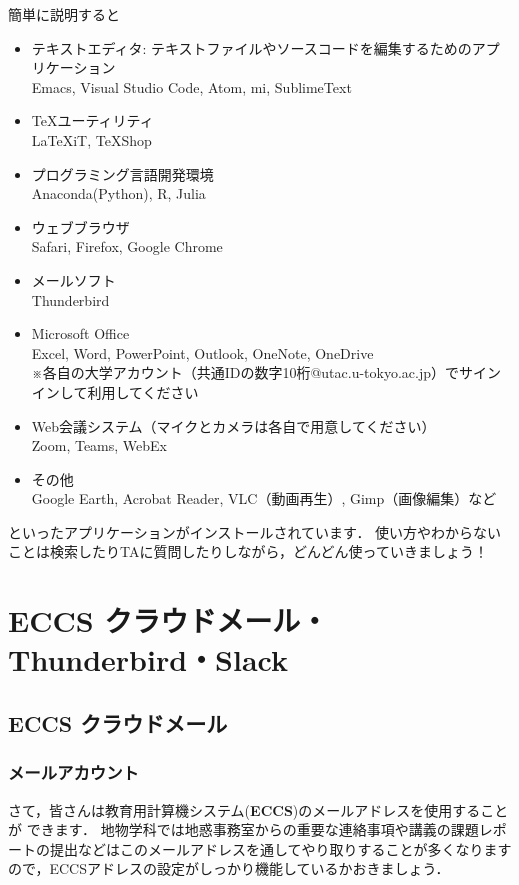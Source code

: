 \documentclass{jarticle}
\begin{document}
簡単に説明すると
\begin{itemize}
  \item テキストエディタ: テキストファイルやソースコードを編集するためのアプリケーション\\
    Emacs, Visual Studio Code, Atom, mi, SublimeText
  \item \TeX ユーティリティ\\
    LaTeXiT, TeXShop
  \item プログラミング言語開発環境\\
    Anaconda(Python), R, Julia
  \item ウェブブラウザ\\
    Safari, Firefox, Google Chrome
  \item メールソフト\\
    Thunderbird
  \item Microsoft Office\\
    Excel, Word, PowerPoint, Outlook, OneNote, OneDrive\\
    ※各自の大学アカウント（共通IDの数字10桁@utac.u-tokyo.ac.jp）でサインインして利用してください
  \item Web会議システム（マイクとカメラは各自で用意してください）\\
    Zoom, Teams, WebEx
  \item その他\\
    Google Earth, Acrobat Reader, VLC（動画再生）, Gimp（画像編集）など
\end{itemize}
といったアプリケーションがインストールされています．
使い方やわからないことは検索したりTAに質問したりしながら，どんどん使っていきましょう！

\newpage
\section{ECCS クラウドメール・Thunderbird・Slack}
\subsection{ECCS クラウドメール}
\subsubsection{メールアカウント}
さて，皆さんは教育用計算機システム({\bf ECCS})のメールアドレスを使用することが
できます．
地物学科では地惑事務室からの重要な連絡事項や講義の課題レポートの提出などはこのメールアドレスを通してやり取りすることが多くなりますので，ECCSアドレスの設定がしっかり機能しているかおきましょう．
\end{document}
